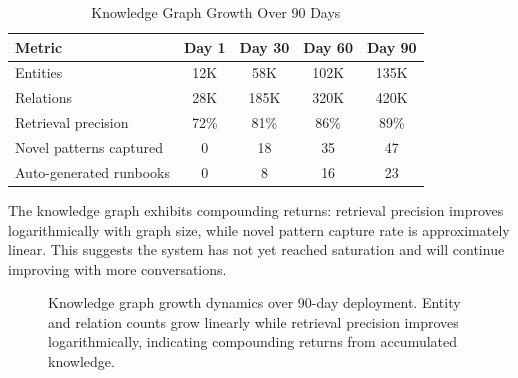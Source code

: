 \documentclass[conference,10pt]{IEEEtran}
\begin{document}
\begin{table}[!htbp]
\caption{Knowledge Graph Growth Over 90 Days}
\label{tab:kggrowth}
\centering\scriptsize
\begin{tabular}{@{}lcccc@{}}
\toprule
\textbf{Metric} & \textbf{Day 1} & \textbf{Day 30} & \textbf{Day 60} & \textbf{Day 90} \\
\midrule
Entities & 12K & 58K & 102K & 135K \\
Relations & 28K & 185K & 320K & 420K \\
Retrieval precision & 72\% & 81\% & 86\% & 89\% \\
Novel patterns captured & 0 & 18 & 35 & 47 \\
Auto-generated runbooks & 0 & 8 & 16 & 23 \\
\bottomrule
\end{tabular}
\end{table}

The knowledge graph exhibits compounding returns: retrieval precision improves logarithmically with graph size, while novel pattern capture rate is approximately linear. This suggests the system has not yet reached saturation and will continue improving with more conversations.


\begin{figure}[!t]
\centering
{}
\caption{Knowledge graph growth dynamics over 90-day deployment. Entity and relation counts grow linearly while retrieval precision improves logarithmically, indicating compounding returns from accumulated knowledge.}
\label{fig:kggrowth}
\end{figure}
\end{document}

